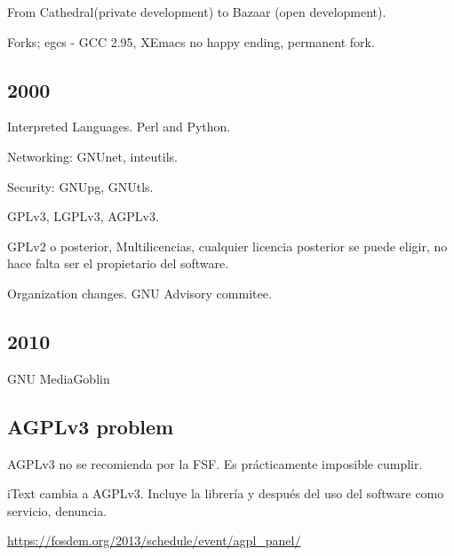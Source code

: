 \documentclass[11pt]{scrartcl}
\begin{document}
\par From Cathedral(private development) to Bazaar (open development). 

\par Forks; egcs - GCC 2.95, XEmacs no happy ending, permanent fork.


\subsection{2000}
\label{sub:2000}

\par Interpreted Languages. Perl and Python.

\par Networking: GNUnet, inteutils.

\par Security: GNUpg, GNUtls.

\par GPLv3, LGPLv3, AGPLv3.

\par GPLv2 o posterior, Multilicencias, cualquier licencia posterior se puede eligir, no hace falta ser el propietario del software.

\par Organization changes. GNU Advisory commitee.


\subsection{2010}
\label{sub:2010}

\par GNU MediaGoblin


\subsection{AGPLv3 problem}
\label{sub:agpl}

\par AGPLv3 no se recomienda por la FSF. Es pr\'acticamente imposible cumplir. 

\par iText cambia a AGPLv3. Incluye la librer\'ia y despu\'es del uso del software como servicio, denuncia.

\url{https://fosdem.org/2013/schedule/event/agpl_panel/}

\end{document}
